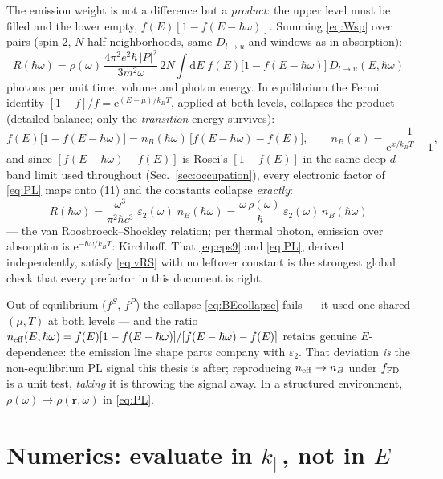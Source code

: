 \documentclass[11pt,a4paper]{article}
\numberwithin{equation}{section}
\newcommand{\hw}{\hbar\omega}
\newcommand{\kpar}{k_{\parallel}}
\newcommand{\eps}{\varepsilon}
\newcommand{\dd}{\mathrm{d}}
\newcommand{\Dlu}{D_{l\to u}}
\newcommand{\fFD}{f}
\newcommand{\kB}{k_B}
\newcommand{\rme}{\mathrm{e}}
\begin{document}
The emission weight is not a difference but a \emph{product}: the
upper level must be filled and the lower empty,
$\fFD(E)[1-\fFD(E-\hw)]$.  Summing \eqref{eq:Wsp} over pairs (spin 2,
$N$ half-neighborhoods, same $\Dlu$ and windows as in absorption):
\begin{equation}
\boxed{\;
R(\hw)=\rho(\omega)\,\frac{4\pi^2e^2\hbar\,|P|^2}{3m^2\omega}\,
2N\!\int\!\dd E\;
\fFD(E)\bigl[1-\fFD(E-\hw)\bigr]\,\Dlu(E,\hw)
\;}
\label{eq:PL}
\end{equation}
photons per unit time, volume and photon energy.  In equilibrium the
Fermi identity $[1-\fFD]/\fFD=\rme^{(E-\mu)/\kB T}$, applied at both
levels, collapses the product (detailed balance; only the
\emph{transition} energy survives):
\begin{equation}
\fFD(E)\bigl[1-\fFD(E-\hw)\bigr]
=n_B(\hw)\,\bigl[\fFD(E-\hw)-\fFD(E)\bigr],
\qquad n_B(x)=\frac{1}{\rme^{x/\kB T}-1},
\label{eq:BEcollapse}
\end{equation}
and since $[\fFD(E-\hw)-\fFD(E)]$ is Rosei's $[1-\fFD(E)]$ in the same
deep-$d$-band limit used throughout (Sec.~\ref{sec:occupation}), every
electronic factor of \eqref{eq:PL} maps onto (11) and the constants
collapse \emph{exactly}:
\begin{equation}
\boxed{\;
R(\hw)=\frac{\omega^3}{\pi^2\hbar c^3}\;\eps_2(\omega)\;n_B(\hw)
=\frac{\omega\,\rho(\omega)}{\hbar}\,\eps_2(\omega)\,n_B(\hw)
\;}
\label{eq:vRS}
\end{equation}
--- the van Roosbroeck--Shockley relation; per thermal photon,
emission over absorption is $\rme^{-\hw/\kB T}$: Kirchhoff.  That
\eqref{eq:eps9} and \eqref{eq:PL}, derived independently, satisfy
\eqref{eq:vRS} with no leftover constant is the strongest global check
that every prefactor in this document is right.

Out of equilibrium ($f^S$, $f^P$) the collapse \eqref{eq:BEcollapse}
fails --- it used one shared $(\mu,T)$ at both levels --- and the ratio
$n_{\rm eff}(E,\hw)=\fFD(E)[1-\fFD(E-\hw)]/[\fFD(E-\hw)-\fFD(E)]$
retains genuine $E$-dependence: the emission line shape parts company
with $\eps_2$.  That deviation \emph{is} the non-equilibrium PL signal
this thesis is after; reproducing $n_{\rm eff}\to n_B$ under
$\fFD_{\rm FD}$ is a unit test, \emph{taking} it is throwing the
signal away.  In a structured environment,
$\rho(\omega)\to\rho(\mathbf r,\omega)$ in \eqref{eq:PL}.

\section{Numerics: evaluate in $\kpar$, not in $E$}\label{sec:numerics}
\end{document}
